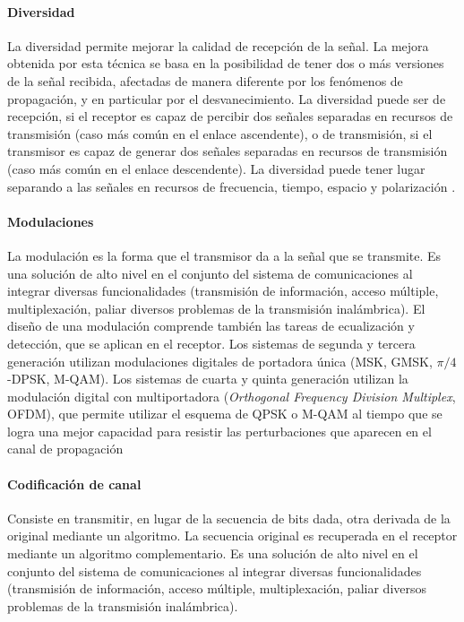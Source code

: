 \documentclass[12pt]{report} %
\begin{document}
\paragraph{Diversidad}

La diversidad permite mejorar la calidad de recepción de la señal.
La mejora obtenida por esta técnica se basa en la posibilidad de tener dos o más versiones de la señal recibida,
afectadas de manera diferente por los fenómenos de propagación, y en particular por el desvanecimiento.
La diversidad puede ser de recepción, si el receptor es capaz de percibir dos señales separadas en recursos de transmisión (caso más común en el enlace ascendente),
o de transmisión, si el transmisor es capaz de generar dos señales separadas en recursos de transmisión (caso más común en el enlace descendente).
La diversidad puede tener lugar separando a las señales en recursos de frecuencia, tiempo, espacio y polarización \cite{RefWorks:78}.

\paragraph{Modulaciones}

La modulación es la forma que el transmisor da a la señal que se transmite.
Es una solución de alto nivel en el conjunto del sistema de comunicaciones al integrar diversas funcionalidades
(transmisión de información, acceso múltiple, multiplexación, paliar diversos problemas de la transmisión inalámbrica).
El diseño de una modulación comprende también las tareas de ecualización y detección, que se aplican en el receptor.
Los sistemas de segunda y tercera generación utilizan modulaciones digitales de portadora única (MSK, GMSK, $\pi / 4$-DPSK, M-QAM).
Los sistemas de cuarta y quinta generación utilizan la modulación digital con multiportadora (\textit{Orthogonal Frequency Division Multiplex}, OFDM),
que permite utilizar el esquema de QPSK o M-QAM al tiempo que se logra una mejor capacidad para resistir las perturbaciones que aparecen en el canal de propagación
\cite{RefWorks:84, RefWorks:85, RefWorks:86, RefWorks:87, RefWorks:78, RefWorks:80, RefWorks:26}

\paragraph{Codificación de canal}

Consiste en transmitir, en lugar de la secuencia de bits dada, otra derivada de la original mediante un algoritmo.
La secuencia original es recuperada en el receptor mediante un algoritmo complementario.
Es una solución de alto nivel en el conjunto del sistema de comunicaciones al integrar diversas funcionalidades
(transmisión de información, acceso múltiple, multiplexación, paliar diversos problemas de la transmisión inalámbrica).
\cite{RefWorks:89, RefWorks:78}
\end{document}
